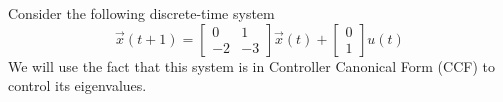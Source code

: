 


Consider the following discrete-time system
\begin{equation}
 \vec{x}(t + 1) 
= \begin{bmatrix}
0 & 1 \\
-2 & -3
\end{bmatrix}
\vec{x}(t) + 
\begin{bmatrix} 0 \\ 1 \end{bmatrix} u(t)
\end{equation}
We will use the fact that this system is in Controller Canonical Form (CCF) to control its eigenvalues.

